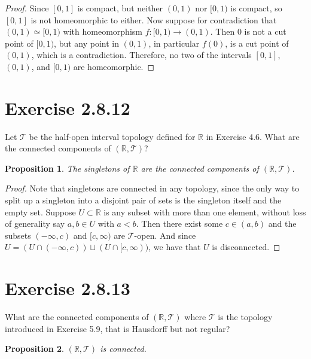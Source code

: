 \documentclass[12pt]{article}
\newtheorem{proposition}{Proposition}
\newenvironment{problem}
    {\begin{lrbox}{\mybox}\begin{minipage}{\textwidth-10pt}}
    {\end{minipage}\end{lrbox}\framebox[6.5in]{\usebox{\mybox}}}
\newcommand{\R}{\mathbb{R}}
\newcommand{\T}{\mathscr{T}}
\begin{document}
\begin{proof}
    Since $[0,1]$ is compact, but neither $(0,1)$ nor $[0,1)$ is compact, so $[0,1]$ is not homeomorphic to either. Now suppose for contradiction that $(0,1)\simeq[0,1)$ with homeomorphism $f:[0,1)\to(0,1)$. Then $0$ is not a cut point of $[0,1)$, but any point in $(0,1)$, in particular $f(0)$, is a cut point of $(0,1)$, which is a contradiction. Therefore, no two of the intervals $[0,1]$, $(0,1)$, and $[0,1)$ are homeomorphic.
    
\end{proof}

\section*{Exercise 2.8.12}
\begin{problem}
    Let $\T$ be the half-open interval topology defined for $\R$ in Exercise 4.6. What are the connected components of $(\R,\T)$?
\end{problem}

\begin{proposition}
    The singletons of $\R$ are the connected components of $(\R,\T)$.
\end{proposition}

\begin{proof}
    Note that singletons are connected in any topology, since the only way to split up a singleton into a disjoint pair of sets is the singleton itself and the empty set. Suppose $U\subset \R$ is any subset with more than one element, without loss of generality say $a,b\in U$ with $a<b$. Then there exist some $c\in(a,b)$ and the subsets $(-\infty,c)$ and $[c,\infty)$ are $\T$-open. And since $U=(U\cap(-\infty,c))\sqcup(U\cap[c,\infty))$, we have that $U$ is disconnected.
    
\end{proof}

\newpage
\section*{Exercise 2.8.13}
\begin{problem}
    What are the connected components of $(\R,\T)$ where $\T$ is the topology introduced in Exercise 5.9, that is Hausdorff but not regular?
\end{problem}

\begin{proposition}
    $(\R,\T)$ is connected.
\end{proposition}
\end{document}
